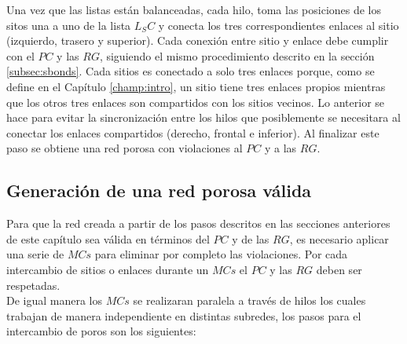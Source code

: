 Una vez que las listas están balanceadas, cada hilo, toma las posiciones de los sitos una a uno de la lista $L_SC$ y conecta los tres correspondientes enlaces al sitio (izquierdo, trasero y superior). Cada conexión entre sitio y enlace debe cumplir con el $PC$ y las $RG$, siguiendo el mismo procedimiento descrito en la sección \ref{subsec:sbonds}. Cada sitios es conectado a solo tres enlaces porque, como se define en el Capítulo \ref{champ:intro}, un sitio tiene tres enlaces propios mientras que los otros tres enlaces son compartidos con los sitios vecinos. Lo anterior se hace para evitar la sincronización entre los hilos que posiblemente se necesitara al conectar los enlaces compartidos (derecho, frontal e inferior). Al finalizar este paso se obtiene una red porosa con violaciones al $PC$ y a las $RG$.

\subsection{Generación de una red porosa válida}
\label{subsec:pvalid}
Para que la red creada a partir de los pasos descritos en las secciones anteriores de este capítulo sea válida en términos del $PC$ y de las $RG$, es necesario aplicar una serie de $MCs$ para eliminar por completo las violaciones. Por cada intercambio de sitios o enlaces durante un $MCs$ el $PC$ y las $RG$ deben ser respetadas.\\

De igual manera los $MCs$ se realizaran paralela a través de hilos los cuales trabajan de manera independiente en distintas subredes, los pasos para el intercambio de poros son los siguientes: 


